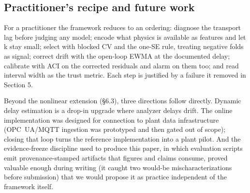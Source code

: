 \subsection{Practitioner's recipe and future work}

For a practitioner the framework reduces to an ordering: diagnose the transport lag
before judging any model; encode what physics is available as features and let k stay
small; select with blocked CV and the one-SE rule, treating negative folds as signal;
correct drift with the open-loop EWMA at the documented delay; calibrate with ACI on
the corrected residuals and alarm on them too; and read interval width as the trust
metric. Each step is justified by a failure it removed in Section 5.

Beyond the nonlinear extension (\S 6.3), three directions follow directly. Dynamic
delay estimation \citep{wang2021dtde} is a drop-in upgrade where analyzer delays drift.
The online implementation was designed for connection to plant data infrastructure (OPC~UA/MQTT ingestion was prototyped and then gated out of scope); closing that loop turns the reference implementation into a plant pilot. And the evidence-freeze
discipline used to produce this paper, in which evaluation scripts emit provenance-stamped
artifacts that figures and claims consume, proved valuable enough during writing
(it caught two would-be mischaracterizations before submission) that we would propose
it as practice independent of the framework itself.

